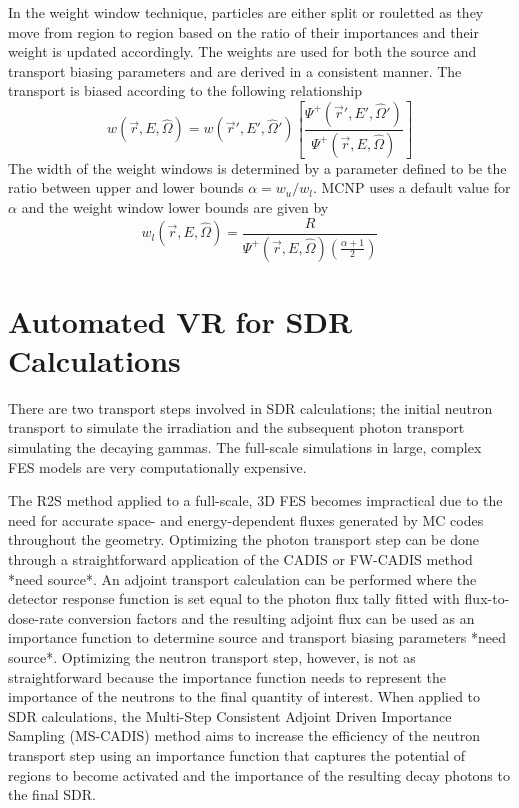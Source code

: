 In the weight window technique, particles are either split or
rouletted as they move from region to region based on the ratio of their
importances and their weight is updated accordingly.  
The weights are used for both the source and transport biasing parameters and
are derived %
in a consistent manner.  
The transport is biased according to the following relationship
\begin{equation} \label{eq:3.11}
	w(\overrightarrow{r}, E, \widehat{\Omega})=
	w(\overrightarrow{r}', E', \widehat{\Omega}')
	\left [ \frac{\Psi^{+}(\overrightarrow{r}', E', \widehat{\Omega}')}
	{\Psi^{+}(\overrightarrow{r}, E, \widehat{\Omega})} \right ]
\end{equation}
The width of the weight windows is determined by a parameter defined to be the
ratio between upper and lower bounds $\alpha =
w_{u}/w_{l}$.  MCNP uses a default value for $\alpha$ and the weight window lower
bounds are given by 
\begin{equation} \label{eq:3.12}
	w_{l}(\overrightarrow{r}, E, \widehat{\Omega}) = 
	\frac{R}{\Psi^{+}(\overrightarrow{r}, E, \widehat{\Omega})
	(\frac{\alpha + 1}{2})}
\end{equation}




\section{Automated VR for SDR Calculations}\label{sec:auto_vr_sdr}
There are two transport steps involved in SDR calculations; the initial
neutron transport to simulate the irradiation and the subsequent photon
transport simulating the decaying gammas.  The full-scale simulations in
large, complex FES models are very computationally expensive.

The R2S method applied to a full-scale, 3D FES becomes impractical due to the
need for accurate space- and energy-dependent fluxes generated by MC codes 
throughout the geometry.  Optimizing the photon transport step can be done
through a
straightforward application of the CADIS or FW-CADIS method *need source*.  An
adjoint transport calculation can be performed where the detector
response function  is set equal to the photon flux tally fitted with
flux-to-dose-rate conversion factors and the resulting adjoint flux can be used as an
importance function to determine source and transport biasing parameters *need
source*.  
Optimizing the neutron transport step, however, is not as
straightforward
because the importance function needs to represent the importance of the neutrons to the
final quantity of interest\cite{Ibrahim_2015}.
When applied to SDR calculations, the Multi-Step Consistent Adjoint Driven Importance Sampling (MS-CADIS) method
aims to increase the efficiency of the neutron transport step using an importance function
that captures the potential of regions to become activated and the importance of
the resulting decay photons to the final SDR\cite{Ibrahim_2015}.

